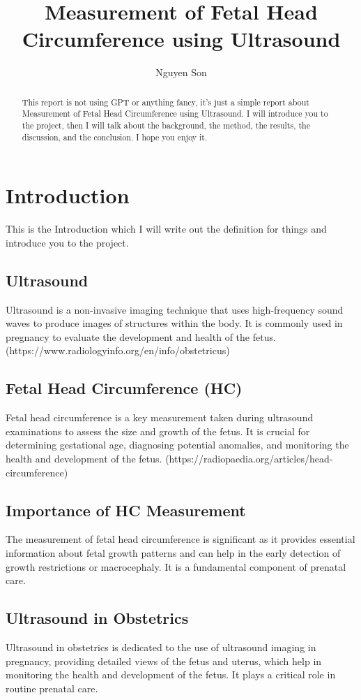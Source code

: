 \documentclass[conference]{IEEEtran}
\title{Measurement of Fetal Head Circumference using Ultrasound}
\author{Nguyen Son}
\begin{document}
\maketitle

\begin{abstract}
    This report is not using GPT or anything fancy, it's just a simple report about Measurement of Fetal Head Circumference using Ultrasound. I will introduce you to the project, then I will talk about the background, the method, the results, the discussion, and the conclusion. I hope you enjoy it.
\end{abstract}

\section{Introduction}
This is the Introduction which I will write out the definition for things and introduce you to the project.

\subsection{Ultrasound}
Ultrasound is a non-invasive imaging technique that uses high-frequency sound waves to produce images of structures within the body. It is commonly used in pregnancy to evaluate the development and health of the fetus. (https://www.radiologyinfo.org/en/info/obstetricus)

\subsection{Fetal Head Circumference (HC)}
Fetal head circumference is a key measurement taken during ultrasound examinations to assess the size and growth of the fetus. It is crucial for determining gestational age, diagnosing potential anomalies, and monitoring the health and development of the fetus. (https://radiopaedia.org/articles/head-circumference)

\subsection{Importance of HC Measurement}
The measurement of fetal head circumference is significant as it provides essential information about fetal growth patterns and can help in the early detection of growth restrictions or macrocephaly. It is a fundamental component of prenatal care.

\subsection{Ultrasound in Obstetrics}
Ultrasound in obstetrics is dedicated to the use of ultrasound imaging in pregnancy, providing detailed views of the fetus and uterus, which help in monitoring the health and development of the fetus. It plays a critical role in routine prenatal care.
\end{document}
